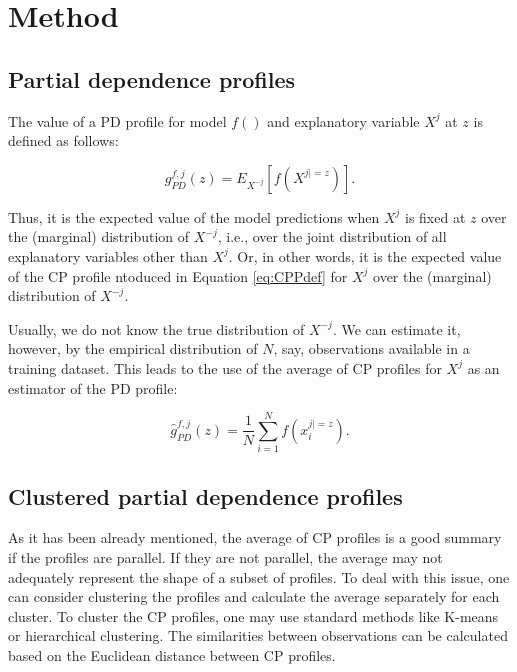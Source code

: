 \documentclass[]{krantz}
\begin{document}
\hypertarget{PDPMethod}{%
\section{Method}\label{PDPMethod}}

\hypertarget{PDPs}{%
\subsection{Partial dependence profiles}\label{PDPs}}

The value of a PD profile for model \(f()\) and explanatory variable \(X^j\) at \(z\) is defined as follows:

\begin{equation}
g_{PD}^{f, j}(z) = E_{X^{-j}}[f(X^{j|=z})].
\label{eq:PDPdef0}
\end{equation}

Thus, it is the expected value of the model predictions when \(X^j\) is fixed at \(z\) over the (marginal) distribution of \(X^{-j}\), i.e., over the joint distribution of all explanatory variables other than \(X^j\). Or, in other words, it is the expected value of the CP profile ntoduced in Equation \eqref{eq:CPPdef} for \(X^j\) over the (marginal) distribution of \(X^{-j}\).

Usually, we do not know the true distribution of \(X^{-j}\). We can estimate it, however, by the empirical distribution of \(N\), say, observations available in a training dataset. This leads to the use of the average of CP profiles for \(X^j\) as an estimator of the PD profile:

\begin{equation}
\hat g_{PD}^{f, j}(z) =  \frac{1}{N} \sum_{i=1}^{N} f(x_i^{j|=z}).
\label{eq:PDPest}
\end{equation}

\hypertarget{clusteredPDPs}{%
\subsection{Clustered partial dependence profiles}\label{clusteredPDPs}}

As it has been already mentioned, the average of CP profiles is a good summary if the profiles are parallel. If they are not parallel, the average may not adequately represent the shape of a subset of profiles. To deal with this issue, one can consider clustering the profiles and calculate the average separately for each cluster. To cluster the CP profiles, one may use standard methods like K-means or hierarchical clustering. The similarities between observations can be calculated based on the Euclidean distance between CP profiles.
\end{document}

